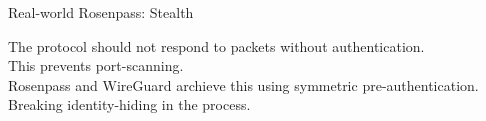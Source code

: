 \begin{frame}{Real-world Rosenpass: Stealth}
  \begin{minipage}{.5\pagewidth}
    \centering
    The protocol should not respond to packets without authentication.
    \\[1.3em] This prevents port-scanning.
    \\[1.3em] Rosenpass and WireGuard archieve this using symmetric pre-authentication.
    \\[1.3em] Breaking identity-hiding in the process.
  \end{minipage}
\end{frame}
